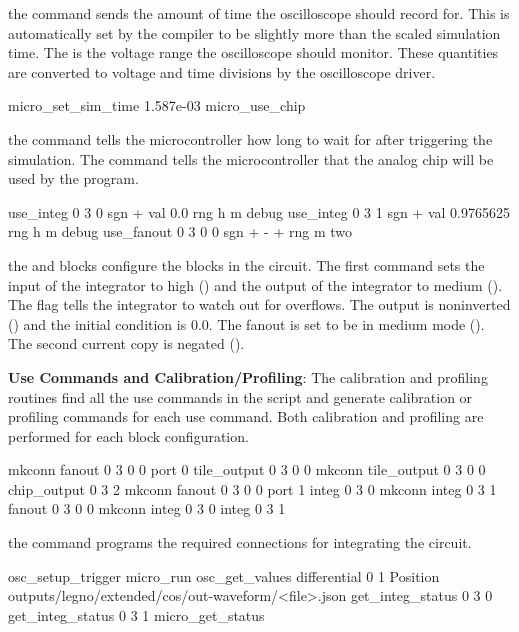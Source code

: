 \noindent the  command sends the amount of time the
oscilloscope should record for. This is automatically set by the compiler to be
slightly more than the scaled simulation time. The  is
the voltage range the oscilloscope should monitor. These quantities are
converted to voltage and time divisions by the oscilloscope driver.

\begin{snippet}
micro_set_sim_time 1.587e-03
micro_use_chip
\end{snippet}

\noindent the  command tells the microcontroller how long
to wait for after triggering the simulation. The  command
tells the microcontroller that the analog chip will be used by the program.

\begin{snippet}
use_integ 0 3 0 sgn + val 0.0 rng h m debug
use_integ 0 3 1 sgn + val 0.9765625 rng h m debug
use_fanout 0 3 0 0  sgn + - + rng m two
\end{snippet}

\noindent the  and  blocks configure the
blocks in the circuit. The first  command sets the input of the
integrator to high () and the output of the integrator to medium ().
The  flag tells the integrator to watch out for overflows.
The output is noninverted () and the initial condition is 0.0. The
fanout is set to be in medium mode (). The second current copy is negated
(\tx{+ - +}). 

\noindent\textbf{Use Commands and Calibration/Profiling}: The calibration and
profiling routines find all the use commands in the script and generate
calibration or profiling commands for each use command. Both calibration and
profiling are performed for each block configuration. 

\begin{snippet}
mkconn fanout 0 3 0 0 port 0 tile_output 0 3 0 0
mkconn tile_output 0 3 0 0 chip_output 0 3 2
mkconn fanout 0 3 0 0 port 1 integ 0 3 0
mkconn integ 0 3 1 fanout 0 3 0 0
mkconn integ 0 3 0 integ 0 3 1
\end{snippet}

\noindent the  command programs the required connections for
integrating the circuit.

\begin{snippet}
osc_setup_trigger
micro_run
osc_get_values differential 0 1 Position outputs/legno/extended/cos/out-waveform/<file>.json
get_integ_status 0 3 0
get_integ_status 0 3 1
micro_get_status
\end{snippet}

